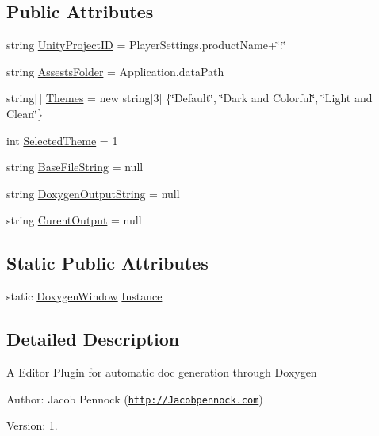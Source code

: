 \subsection*{Public Attributes}
\begin{DoxyCompactItemize}
\item 
string \hyperlink{class_doxygen_window_a0c52f34973444c41e90151536dbd6e82}{Unity\+Project\+ID} = Player\+Settings.\+product\+Name+\char`\"{}\+:\char`\"{}
\item 
string \hyperlink{class_doxygen_window_a470870b3c6a44b3fe2f57870e39cfe55}{Assests\+Folder} = Application.\+data\+Path
\item 
string\mbox{[}$\,$\mbox{]} \hyperlink{class_doxygen_window_a2dfb0ba26737a0e996797c2848cc2fc0}{Themes} = new string\mbox{[}3\mbox{]} \{\char`\"{}Default\char`\"{}, \char`\"{}Dark and Colorful\char`\"{}, \char`\"{}Light and Clean\char`\"{}\}
\item 
int \hyperlink{class_doxygen_window_aff9bfc8c7ed3f017a61e67025ea7c99a}{Selected\+Theme} = 1
\item 
string \hyperlink{class_doxygen_window_a7a4acfac0a07a2a05f183e4f0bc53b62}{Base\+File\+String} = null
\item 
string \hyperlink{class_doxygen_window_a20e7d1bdb1f32c97f600bf0f0bdb2358}{Doxygen\+Output\+String} = null
\item 
string \hyperlink{class_doxygen_window_a82b41ae2e3c44b050acc7603031ccd55}{Curent\+Output} = null
\end{DoxyCompactItemize}
\subsection*{Static Public Attributes}
\begin{DoxyCompactItemize}
\item 
static \hyperlink{class_doxygen_window}{Doxygen\+Window} \hyperlink{class_doxygen_window_a45d09c9a64d2873367470303789e3bf9}{Instance}
\end{DoxyCompactItemize}


\subsection{Detailed Description}


A Editor Plugin for automatic doc generation through Doxygen

Author\+: Jacob Pennock (\href{http://Jacobpennock.com}{\tt http\+://\+Jacobpennock.\+com})

Version\+: 1.

